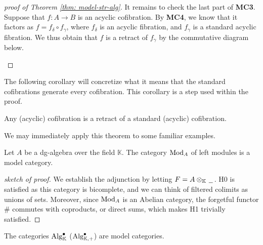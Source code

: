 \documentclass[../thesis.tex]{subfiles}
\begin{document}
\begin{proof}[proof of Theorem \ref{thm: model-str-alg}]
                It remains to check the last part of \textbf{MC3}. Suppose that $f: A\rightarrow B$ is an acyclic cofibration. By \textbf{MC4}, we know that it factors as $f = f_\delta \circ f_\gamma$, where $f_\delta$ is an acyclic fibration, and $f_\gamma$ is a standard acyclic fibration. We thus obtain that $f$ is a retract of $f_\gamma$ by the commutative diagram below.
                \begin{center}
                \end{center}
            \end{proof}

            The following corollary will concretize what it means that the standard cofibrations generate every cofibration. This corollary is a step used within the proof.

            \begin{corollary}
                Any (acyclic) cofibration is a retract of a standard (acyclic) cofibration.
            \end{corollary}

            We may immediately apply this theorem to some familiar examples.

            \begin{corollary}\label{cor: Model-Mod}
                Let $A$ be a dg-algebra over the field $\mathbb{K}$. The category $\tt{Mod}_A$ of left modules is a model category.
            \end{corollary}

            \begin{proof}[sketch of proof]
                We establish the adjunction by letting $F = A\otimes_\mathbb{K}\argument$. H0 is satisfied as this category is bicomplete, and we can think of filtered colimits as unions of sets. Moreover, since $\tt{Mod}_A$ is an Abelian category, the forgetful functor $\#$ commutes with coproducts, or direct sums, which makes H1 trivially satisfied.
            \end{proof}

            \begin{corollary}
                The categories $\tt{Alg}^\bullet_\mathbb{K}$ ($\tt{Alg}^\bullet_{\mathbb{K},+}$) are model categories.
            \end{corollary}
\end{document}
